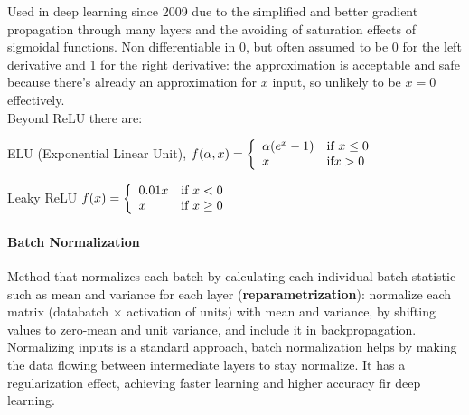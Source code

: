 \documentclass[10pt]{report}
\begin{document}
Used in deep learning since 2009 due to the simplified and better gradient propagation through many layers and the avoiding of saturation effects of sigmoidal functions. Non differentiable in 0, but often assumed to be 0 for the left derivative and 1 for the right derivative: the approximation is acceptable and safe because there's already an approximation for $x$ input, so unlikely to be $x=0$ effectively.\\
Beyond ReLU there are:
\begin{list}{}{}
	\item ELU (Exponential Linear Unit), $f(\alpha,x)=\left\{\begin{array}{l l}
	\alpha(e^x - 1)&\hbox{if }x \leq 0\\
	x&\hbox{if} x > 0
	\end{array}\right.$
	\item Leaky ReLU $f(x) = \left\{\begin{array}{l l}
	0.01x&\hbox{if }x < 0\\
	x&\hbox{if }x \geq 0 
	\end{array}\right.$
\end{list}
\paragraph{Batch Normalization} Method that normalizes each batch by calculating each individual batch statistic such as mean and variance for each layer (\textbf{reparametrization}): normalize each matrix (databatch $\times$ activation of units) with mean and variance, by shifting values to zero-mean and unit variance, and include it in backpropagation.\\
Normalizing inputs is a standard approach, batch normalization helps by making the data flowing between intermediate layers to stay normalize. It has a regularization effect, achieving faster learning and higher accuracy fir deep learning.
\end{document}
